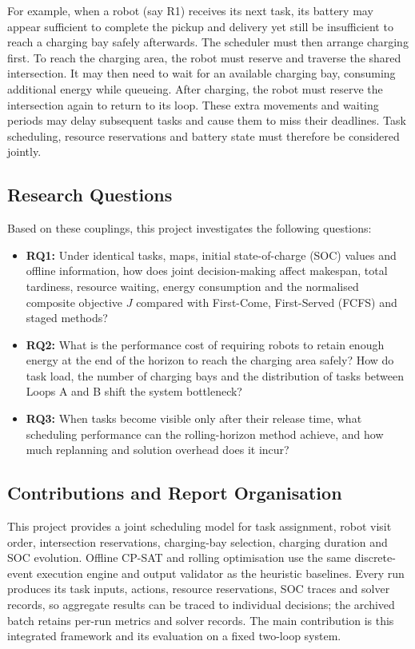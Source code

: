 \documentclass[11pt,a4paper]{article}
\begin{document}
For example, when a robot (say R1) receives its next task, its battery may appear sufficient to
complete the pickup and delivery yet still be insufficient to reach a charging bay safely afterwards.
The scheduler must then arrange charging first. To reach the charging area, the robot must reserve and
traverse the shared intersection. It may then need to wait for an available charging bay, consuming
additional energy while queueing. After charging, the robot must reserve the intersection again to
return to its loop. These extra movements and waiting periods may delay subsequent tasks and cause
them to miss their deadlines. Task scheduling, resource reservations and battery state must therefore
be considered jointly.

\subsection{Research Questions}

Based on these couplings, this project investigates the following questions:
\begin{itemize}
\item \textbf{RQ1:} Under identical tasks, maps, initial state-of-charge (SOC) values and offline
  information, how does joint decision-making affect makespan, total tardiness, resource waiting,
  energy consumption and the normalised composite objective $J$ compared with First-Come,
  First-Served (FCFS) and staged methods?
\item \textbf{RQ2:} What is the performance cost of requiring robots to retain enough energy at
  the end of the horizon to reach the charging area safely? How do task load, the number of charging
  bays and the distribution of tasks between Loops A and B shift the system bottleneck?
\item \textbf{RQ3:} When tasks become visible only after their release time, what scheduling
  performance can the rolling-horizon method achieve, and how much replanning and solution overhead
  does it incur?
\end{itemize}

\subsection{Contributions and Report Organisation}

This project provides a joint scheduling model for task assignment, robot visit order, intersection
reservations, charging-bay selection, charging duration and SOC evolution. Offline CP-SAT and rolling
optimisation use the same discrete-event execution engine and output validator as the heuristic
baselines. Every run produces its task inputs, actions, resource reservations, SOC traces and solver
records, so aggregate results can be traced to individual decisions; the archived batch retains per-run
metrics and solver records. The main contribution is this integrated framework and its evaluation on a
fixed two-loop system.
\end{document}
